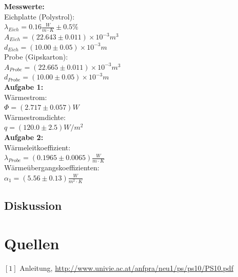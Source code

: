 \documentclass[12pt,a4paper]{article}
\begin{document}
\begin{multicols}{2}

\noindent \textbf{Messwerte:}\\
\noindent Eichplatte (Polystrol):\\
$\lambda_{Eich} = 0.16 \frac{W}{m \cdot K}\pm 0.5\%$\\
$A_{Eich}=(22.643 \pm 0.011)\times 10^{-3}m^3 $\\
$d_{Eich}=(10.00 \pm 0.05)\times 10^{-3}m$\\

\noindent Probe (Gipskarton):\\
$A_{Probe}=(22.665 \pm 0.011)\times 10^{-3}m^3$\\
$d_{Probe}=(10.00 \pm 0.05)\times 10^{-3}m$\\

\noindent \textbf{Aufgabe 1:}\\
Wärmestrom:\\
$\Phi = (2.717 \pm 0.057)W$\\
Wärmestromdichte:\\
$q=(120.0 \pm 2.5)W/m^2$\\

\noindent \textbf{Aufgabe 2:}\\
Wärmeleitkoeffizient:\\
$\lambda_{Probe}=(0.1965 \pm 0.0065)\frac{W}{m \cdot K}$\\
Wärmeübergangskoeffizienten:\\
$\alpha_1=(5.56 \pm 0.13 )\frac{W}{m^2 \cdot K}$\\

\subsection{Diskussion}


\section{Quellen}
$[1]$ Anleitung, \url{http://www.univie.ac.at/anfpra/neu1/ps/ps10/PS10.pdf}\\

\end{multicols}
\end{document}
